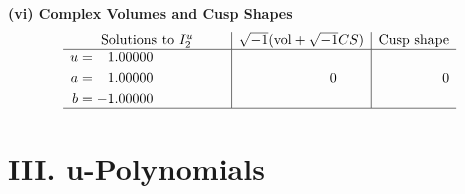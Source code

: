 \documentclass[1p]{elsarticle_modified}
\theoremstyle{definition}
\newcommand{\I}{\sqrt{-1}}
\begin{document}
\newpage\flushleft \textbf{(vi) Complex Volumes and Cusp Shapes}
$$\begin{array}{c|c|c}  
\text{Solutions to }I^u_{2}& \I (\text{vol} + \sqrt{-1}CS) & \text{Cusp shape}\\
 \hline 
\begin{aligned}
u &= \phantom{-}1.00000\phantom{ +0.000000I} \\
a &= \phantom{-}1.00000\phantom{ +0.000000I} \\
b &= -1.00000\phantom{ +0.000000I}\end{aligned}
 & \phantom{-0.000000 } 0 & \phantom{-0.000000 } 0\\
 \hline 
 \end{array}$$\newpage
\newpage\renewcommand{\arraystretch}{1}
\centering \section*{ III. u-Polynomials}
\end{document}
